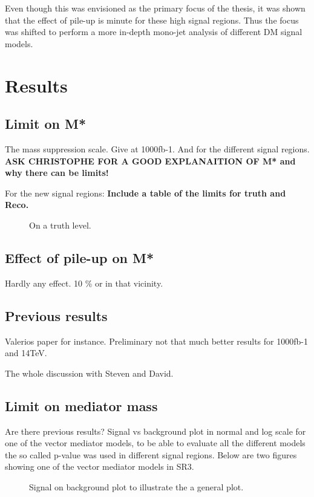 Even though this was envisioned as the primary focus of the thesis, it was shown that the effect of pile-up is minute for these high signal regions. Thus the focus was shifted to perform a more in-depth mono-jet analysis of different DM signal models.
\section{Results}
\subsection{Limit on M*}
The mass suppression scale.
Give at 1000fb-1. And for the different signal regions.
\textbf{ASK CHRISTOPHE FOR A GOOD EXPLANAITION OF M* and why there can be limits!}

For the new signal regions: \textbf{Include a table of the limits for truth and Reco.}
 \begin{figure}[H] %
    \hfill
    \caption{On a truth level.}
    \label{fig:SRnewM}
  \end{figure}

\subsection{Effect of pile-up on M*}
Hardly any effect. 10 \% or in that vicinity.

\subsection{Previous results}
Valerios paper for instance.
Preliminary not that much better results for 1000fb-1 and 14TeV.

The whole discussion with Steven and David.
\subsection{Limit on mediator mass}
Are there previous results?
Signal vs background plot in normal and log scale for one of the vector mediator models, to be able to evaluate all the different models the so called p-value was used in different signal regions. Below are two figures showing one of the vector mediator models in SR3.
 \begin{figure}[H] %
    \hfill
    \caption{Signal on background plot to illustrate the a general plot. }
    \label{fig:sigback}
  \end{figure}

